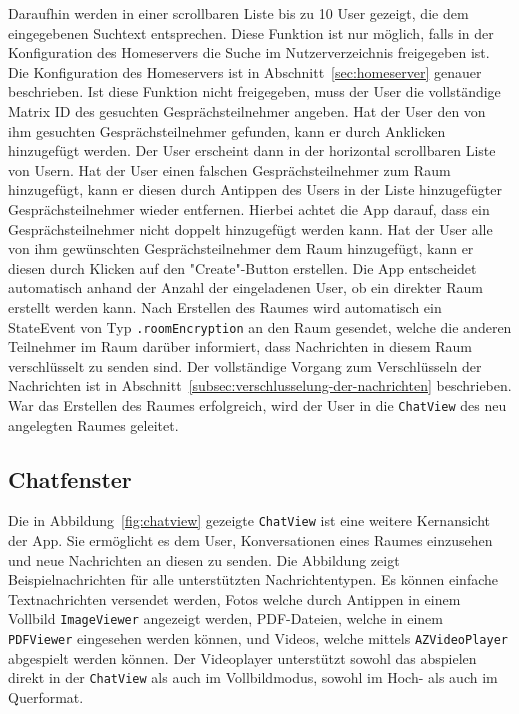     Daraufhin werden in einer scrollbaren Liste bis zu 10 User gezeigt, die dem eingegebenen Suchtext entsprechen.
    Diese Funktion ist nur möglich, falls in der Konfiguration des Homeservers die Suche im Nutzerverzeichnis freigegeben ist.
    Die Konfiguration des Homeservers ist in Abschnitt~\ref{sec:homeserver} genauer beschrieben.
    Ist diese Funktion nicht freigegeben, muss der User die vollständige Matrix ID des gesuchten Gesprächsteilnehmer angeben.
    Hat der User den von ihm gesuchten Gesprächsteilnehmer gefunden, kann er durch Anklicken hinzugefügt werden.
    Der User erscheint dann in der horizontal scrollbaren Liste von Usern.
    Hat der User einen falschen Gesprächsteilnehmer zum Raum hinzugefügt, kann er diesen durch Antippen des Users in der Liste hinzugefügter Gesprächsteilnehmer wieder entfernen.
    Hierbei achtet die App darauf, dass ein Gesprächsteilnehmer nicht doppelt hinzugefügt werden kann.
    Hat der User alle von ihm gewünschten Gesprächsteilnehmer dem Raum hinzugefügt, kann er diesen durch Klicken auf den "Create"-Button erstellen.
    Die App entscheidet automatisch anhand der Anzahl der eingeladenen User, ob ein direkter Raum erstellt werden kann.
    Nach Erstellen des Raumes wird automatisch ein StateEvent von Typ \texttt{.roomEncryption} an den Raum gesendet, welche die anderen Teilnehmer im Raum darüber informiert, dass Nachrichten in diesem Raum verschlüsselt zu senden sind.
    Der vollständige Vorgang zum Verschlüsseln der Nachrichten ist in Abschnitt~\ref{subsec:verschlusselung-der-nachrichten} beschrieben.
    War das Erstellen des Raumes erfolgreich, wird der User in die \texttt{ChatView} des neu angelegten Raumes geleitet.

    \newpage
    \subsection{Chatfenster}
    Die in Abbildung~\ref{fig:chatview} gezeigte \texttt{ChatView} ist eine weitere Kernansicht der App.
    Sie ermöglicht es dem User, Konversationen eines Raumes einzusehen und neue Nachrichten an diesen zu senden.
    Die Abbildung zeigt Beispielnachrichten für alle unterstützten Nachrichtentypen.
    Es können einfache Textnachrichten versendet werden, Fotos welche durch Antippen in einem Vollbild \texttt{ImageViewer} angezeigt werden,
    PDF-Dateien, welche in einem \texttt{PDFViewer} eingesehen werden können, und Videos, welche mittels \texttt{AZVideoPlayer} abgespielt werden können.
    Der Videoplayer unterstützt sowohl das abspielen direkt in der \texttt{ChatView} als auch im Vollbildmodus, sowohl im Hoch- als auch im Querformat.

